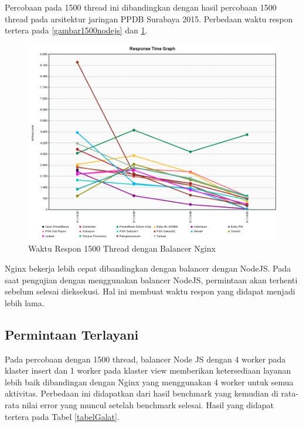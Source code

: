 \documentclass{ta-its}
\begin{document}
					Percobaan pada 1500 thread ini dibandingkan dengan hasil percobaan 1500 thread pada arsitektur jaringan PPDB Surabaya 2015. Perbedaan waktu respon tertera pada \ref{gambar1500nodejs} dan \ref{gambar1500nginx}.
					
					\begin{figure}[h] %
						\centering
						\includegraphics[width=\linewidth]{contoh_img/1500/nginx}
						\caption{Waktu Respon 1500 Thread dengan Balancer Nginx}
						\label{gambar1500nginx}
					\end{figure}
					
					Nginx bekerja lebih cepat dibandingkan dengan balancer dengan NodeJS. Pada saat pengujian dengan menggunakan balancer NodeJS, permintaan akan terhenti sebelum selesai dieksekusi. Hal ini membuat waktu respon yang didapat menjadi lebih lama.
					
				\subsection{Permintaan Terlayani}
					Pada percobaan dengan 1500 thread, balancer Node JS dengan 4 worker pada klaster insert dan 1 worker pada klaster view memberikan ketersediaan layanan lebih baik dibandingan dengan Nginx yang menggunakan 4 worker untuk semua aktivitas. Perbedaan ini didapatkan dari hasil benchmark yang kemudian di rata-rata nilai error yang muncul setelah benchmark selesai. Hasil yang didapat
					tertera pada Tabel \ref{tabelGalat}.
					
\end{document}
